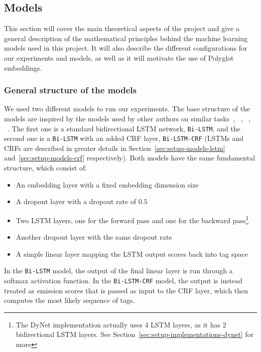 
\subsection{Models}

This section will cover the main theoretical aspects of the project and give a
general description of the mathematical principles behind the machine learning
models used in this project. It will also describe the different configurations
for our experiments and models, as well as it will motivate the use of Polyglot
embeddings.


\subsubsection{General structure of the models}

We used two different models to run our experiments. The base structure of the
models are inspired by the models used by other authors on similar
tasks~\cite{huang2015bidirectional}, ~\cite{plank2016multilingual},
~\cite{reimers2017reporting}, ~\cite{ma2016endtoend}. The first one is a
standard bidirectional LSTM network, \texttt{Bi-LSTM}, and the second one is a
\texttt{Bi-LSTM} with an added CRF layer, \texttt{Bi-LSTM-CRF} (LSTMs and CRFs
are described in greater details in Section~\ref{sec:setup-models-lstm}
and~\ref{sec:setup-models-crf} respectively). Both models have the same
fundamental structure, which consist of:

\begin{itemize}
    \item An embedding layer with a fixed embedding dimension size
    \item A dropout layer with a dropout rate of $0.5$
    \item Two LSTM layers, one for the forward pass and one for the backward
        pass\footnote{The DyNet implementation actually uses 4 LSTM layers, as
            it has 2 bidirectional LSTM layers. See
        Section~\ref{sec:setup-implementations-dynet} for more}
    \item Another dropout layer with the same dropout rate
    \item A simple linear layer mapping the LSTM output scores back into tag
        space
\end{itemize}

In the \texttt{Bi-LSTM} model, the output of the final linear layer is run
through a softmax activation function. In the \texttt{Bi-LSTM-CRF} model, the
output is instead treated as emission scores that is passed as input to the CRF
layer, which then computes the most likely sequence of tags.

